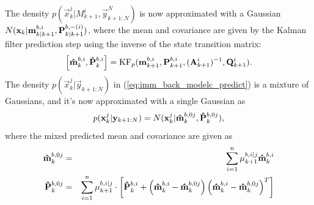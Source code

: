 The density $p(\vec{x}_k^j|M_{k+1}^i,\vec{y}_{k+1:N}^N)$ is now
approximated with a Gaussian
$N(\mathbf{x}_k|\mathbf{m}_{k|k+1}^{b,i},\mathbf{P}_{k|k+1}^{b,-(i)})$, where
the mean and covariance are given by the Kalman filter prediction step
using the inverse of the state transition matrix:
%
\begin{equation}
%
  \left[\vec{\hat{m}}_{k}^{b,i},\mat{\hat{P}}_{k}^{b,i}\right] =
\text{KF}_p(\vec{m}_{k+1}^{b,i},\mat{P}_{k+1}^{b,i},(\mat{A}_{k+1}^i)^{-1},\mat{Q}_{k+1}^i). \label{eq:imm_b_predict}
%
\end{equation}
%
The density $p(\vec{x}_k^j|\vec{y}_{k+1:N})$ in
(\ref{eq:imm_back_modelc_predict}) is a mixture of Gaussians, and it's
now approximated with a single Gaussian as
%
\begin{equation}
%
p(\vec{x}_k^j|\vec{y}_{k+1:N}) =
N(\vec{x}_k^j|\vec{\hat{m}}_{k}^{b,0j},\mat{\hat{P}}_{k}^{b,0j}),
%
\end{equation}
%
where the mixed predicted mean and covariance are given as
%
\begin{eqnarray}
%
\vec{\hat{m}}_{k}^{b,0j} & = & \sum_{i=1}^n \mu_{k+1}^{b,i|j}
\vec{\hat{m}}_{k}^{b,i} \\
%
\mat{\hat{P}}_{k}^{b,0j} & = & \sum_{i=1}^n \mu_{k+1}^{b,i|j} \cdot
\left[ \mat{\hat{P}}_{k}^{b,i} +\left( \vec{\hat{m}}_{k}^{b,i} -
\vec{\hat{m}}_{k}^{b,0j} \right) \left( \vec{\hat{m}}_{k}^{b,i} -
\vec{\hat{m}}_{k}^{b,0j} \right)^T\right]
%
\end{eqnarray}
%

